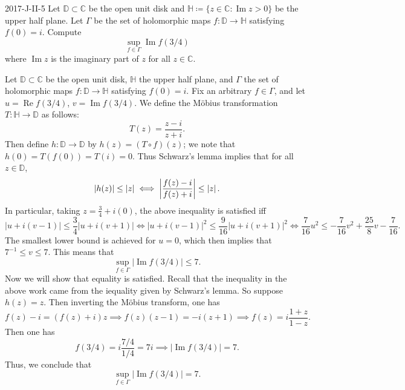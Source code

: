 \documentclass{article}
\begin{document}
	\begin{prb}{2017-J-II-5}
		Let $\mathbb{D} \subset \mathbb{C}$ be the open unit disk and $\mathbb{H}\coloneqq \{z \in \mathbb{C}: \operatorname{Im}{z} > 0\}$ be the upper half plane. Let $\Gamma$ be the set of holomorphic maps $f: \mathbb{D} \to \mathbb{H}$ satisfying $f(0) = i$. Compute 
		\begin{equation*}
			\sup_{f \in \Gamma}\operatorname{Im}{f(3/4)}
		\end{equation*}
		where $\operatorname{Im}{z}$ is the imaginary part of $z$ for all $z \in \mathbb{C}$. 
	\end{prb}
	Let $\mathbb{D} \subset \mathbb{C}$ be the open unit disk, $\mathbb{H}$ the upper half plane, and $\Gamma$ the set of holomorphic maps $f: \mathbb{D} \to \mathbb{H}$ satisfying $f(0) = i$. Fix an arbitrary $f \in \Gamma$, and let $u = \operatorname{Re}{f(3/4)}$, $v = \operatorname{Im}{f(3/4)}$. We define the M\"obius transformation $T: \mathbb{H} \to \mathbb{D}$ as follows: 
	\begin{equation*}
		T(z) = \frac{z - i}{z + i}. 
	\end{equation*}
	Then define $h: \mathbb{D} \to \mathbb{D}$ by $h(z) = (T \circ f)(z)$; we note that $h(0) = T(f(0)) = T(i) = 0$. Thus Schwarz's lemma implies that for all $z \in \mathbb{D}$, 
	\begin{equation*}
		|h(z)| \leq |z| \iff \left| \frac{f(z) - i}{f(z) + i} \right| \leq \left| z \right|. 
	\end{equation*}
	In particular, taking $z = \frac{3}{4} + i(0)$, the above inequality is satisfied iff 
	\begin{equation*}
		|u + i(v - 1)| \leq \frac{3}{4}|u + i(v + 1)| \iff |u + i(v-1)|^{2}\leq \frac{9}{16}|u + i(v + 1)|^{2} \iff \frac{7}{16}u^{2} \leq -\frac{7}{16}v^{2} + \frac{25}{8}v - \frac{7}{16}. 
	\end{equation*}
	The smallest lower bound is achieved for $u  = 0$, which then implies that $7^{-1} \leq v \leq 7$. This means that 
	\begin{equation*}
		\sup_{f \in \Gamma}|\operatorname{Im}{f(3/4)}| \leq 7. 
	\end{equation*}
	Now we will show that equality is satisfied. Recall that the inequality in the above work came from the iequality given by Schwarz's lemma. So suppose $h(z) = z$. Then inverting the M\"obius transform, one has 
	\begin{equation*}
		f(z) - i = (f(z) + i)z \implies f(z)(z - 1) = -i(z + 1) \implies f(z) = i\frac{1 + z}{1 - z}. 
	\end{equation*}
	Then one has 
	\begin{equation*}
		f(3/4) = i\frac{7/4}{1/4} = 7i \implies |\operatorname{Im}{f(3/4)}| = 7. 
	\end{equation*}
	Thus, we conclude that 
	\begin{equation*}
		\sup_{f \in \Gamma}|\operatorname{Im}{f(3/4)}| = 7. 
	\end{equation*}
	
\end{document}
